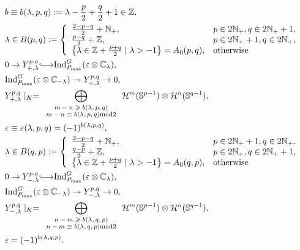 \documentclass[12pt]{article} %
\theoremstyle{remark}
\newcommand{\longhookrightarrow}{{\lhook\joinrel\relbar\joinrel\rightarrow}}
\newcommand{\tmscript}[1]{ {\scriptsize #1} }
\newcommand{\assign}{:=}
\begin{document}
\begin{eqnarray}
  & b \equiv b (\lambda, p, q) \assign \lambda - \frac{p}{2} + \frac{q}{2} +
  1 \in \mathbb{Z},  \label{eqn:20-beplus} & \\
  & \lambda \in B (p, q) \assign \left\{ \begin{array}{ll}
    \frac{2 - p - q}{2} +\mathbb{N}_+, & p \in 2\mathbb{N}_+, q \in
    2\mathbb{N}_+ + 1,\\
    \frac{p - q}{2} +\mathbb{Z}, & p \in 2\mathbb{N}_+ + 1, q \in
    2\mathbb{N}_+,\\
    \left\{ \lambda \in \mathbb{Z}+ \frac{p + q}{2} \mid \lambda > - 1
    \right\} = A_0 (p, q), & \mbox{otherwise}
  \end{array} \right. &  \nonumber\\
  & 0 \rightarrow Y_{+, \lambda}^{p, q} \longhookrightarrow
  \mbox{Ind}_{P_{\max}}^G (\varepsilon \otimes \mathbb{C}_{\lambda}), & 
  \nonumber\\
  & \mbox{Ind}_{P_{\max}}^G (\varepsilon \otimes \mathbb{C}_{- \lambda})
  \twoheadrightarrow Y_{+, \lambda}^{p, q} \rightarrow 0, &  \nonumber\\
  & Y_{+, \lambda}^{p, q} \mid_K = \displaystyle\bigoplus_{\tmscript{\begin{array}{c}
    m - n \geqslant b (\lambda, p, q)\\
    m - n \equiv b (\lambda, p, q) \mbox{mod} 2
  \end{array}}} \mathcal{H}^m (\mathbb{S}^{p - 1}) \otimes \mathcal{H}^n
  (\mathbb{S}^{q - 1}), &  \nonumber\\
  & \varepsilon \equiv \varepsilon (\lambda, p, q) = (- 1)^{b (\lambda, p,
  q)}, &  \nonumber\\
  & \lambda \in B (q, p) \assign \left\{ \begin{array}{ll}
    \frac{2 - p - q}{2} +\mathbb{N}_+, & p \in 2\mathbb{N}_+ + 1, q \in
    2\mathbb{N}_+,\\
    \frac{q - p}{2} +\mathbb{Z}, & p \in 2\mathbb{N}_+, q \in 2\mathbb{N}_+
    + 1,\\
    \left\{ \lambda \in \mathbb{Z}+ \frac{p + q}{2} \mid \lambda > - 1
    \right\} = A_0 (q, p), & \mbox{otherwise}
  \end{array} \right. &  \nonumber\\
  & 0 \rightarrow Y_{-, \lambda}^{p, q} \longhookrightarrow
  \mbox{Ind}_{P_{\max}}^G (\varepsilon \otimes \mathbb{C}_{\lambda}), & 
  \nonumber\\
  & \mbox{Ind}_{P_{\max}}^G (\varepsilon \otimes \mathbb{C}_{- \lambda})
  \twoheadrightarrow Y_{-, \lambda}^{p, q} \rightarrow 0, &  \nonumber\\
  & Y_{-, \lambda}^{p, q} \mid_K = \displaystyle\bigoplus_{\tmscript{\begin{array}{c}
    n - m \geqslant b (\lambda, q, p)\\
    n - m \equiv b (\lambda, q, p) \mbox{mod} 2
  \end{array}}} \mathcal{H}^m (\mathbb{S}^{p - 1}) \otimes \mathcal{H}^n
  (\mathbb{S}^{q - 1}),  \label{eqn:20-beminus} & \\
  & \varepsilon = (- 1)^{b (\lambda, q, p)} . &  \nonumber
\end{eqnarray}
\end{document}

